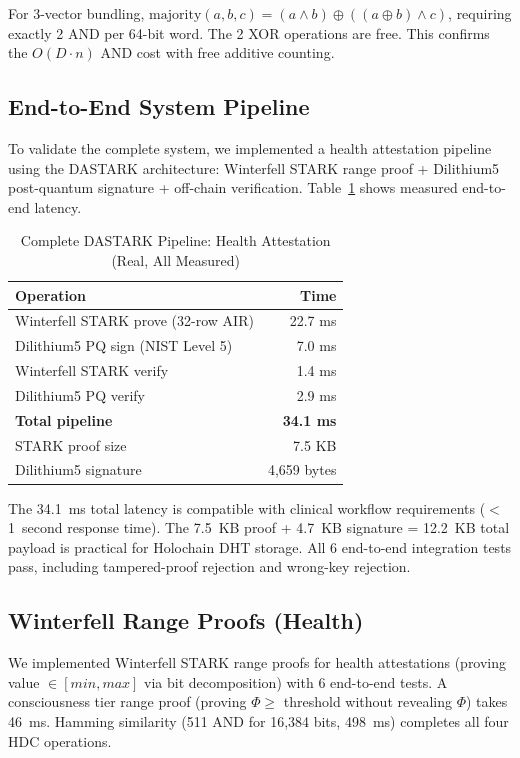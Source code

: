 \documentclass[11pt,twocolumn]{article}
\begin{document}
For 3-vector bundling, $\mathrm{majority}(a,b,c) = (a \wedge b) \oplus ((a \oplus b) \wedge c)$, requiring exactly 2 AND per 64-bit word. The 2 XOR operations are free. This confirms the $O(D \cdot n)$ AND cost with free additive counting.

\subsection{End-to-End System Pipeline}

To validate the complete system, we implemented a health attestation pipeline using the DASTARK architecture: Winterfell STARK range proof + Dilithium5 post-quantum signature + off-chain verification. Table~\ref{tab:e2e} shows measured end-to-end latency.

\begin{table}[t]
\centering
\caption{Complete DASTARK Pipeline: Health Attestation (Real, All Measured)}
\label{tab:e2e}
\begin{tabular}{@{}lr@{}}
\toprule
\textbf{Operation} & \textbf{Time} \\
\midrule
Winterfell STARK prove (32-row AIR) & 22.7 ms \\
Dilithium5 PQ sign (NIST Level 5) & 7.0 ms \\
Winterfell STARK verify & 1.4 ms \\
Dilithium5 PQ verify & 2.9 ms \\
\textbf{Total pipeline} & \textbf{34.1 ms} \\
\midrule
STARK proof size & 7.5 KB \\
Dilithium5 signature & 4,659 bytes \\
\bottomrule
\end{tabular}
\end{table}

The 34.1~ms total latency is compatible with clinical workflow requirements ($<$1~second response time). The 7.5~KB proof + 4.7~KB signature = 12.2~KB total payload is practical for Holochain DHT storage. All 6 end-to-end integration tests pass, including tampered-proof rejection and wrong-key rejection.

\subsection{Winterfell Range Proofs (Health)}

We implemented Winterfell STARK range proofs for health attestations (proving value $\in [min, max]$ via bit decomposition) with 6 end-to-end tests. A consciousness tier range proof (proving $\Phi \geq$ threshold without revealing $\Phi$) takes 46~ms. Hamming similarity (511 AND for 16,384 bits, 498~ms) completes all four HDC operations.
\end{document}
